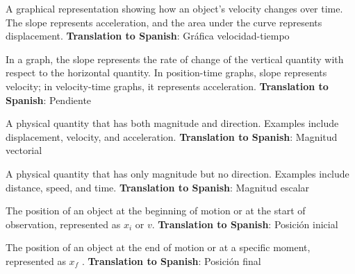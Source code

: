 \begin{vocabulary}
A graphical representation showing how an object's velocity changes over time. The slope represents acceleration, and the area under the curve represents displacement. \newline
\textbf{Translation to Spanish}: Gráfica velocidad-tiempo \newline
\end{vocabulary}

\begin{vocabulary}[Slope]
In a graph, the slope represents the rate of change of the vertical quantity with respect to the horizontal quantity. In position-time graphs, slope represents velocity; in velocity-time graphs, it represents acceleration. \newline
\textbf{Translation to Spanish}: Pendiente \newline
\end{vocabulary}

\begin{vocabulary}
A physical quantity that has both magnitude and direction. Examples include displacement, velocity, and acceleration. \newline
\textbf{Translation to Spanish}: Magnitud vectorial \newline
\end{vocabulary}

\begin{vocabulary}
A physical quantity that has only magnitude but no direction. Examples include distance, speed, and time. \newline
\textbf{Translation to Spanish}: Magnitud escalar \newline
\end{vocabulary}

\begin{vocabulary}
The position of an object at the beginning of motion or at the start of observation, represented as \( x_i \) or \(v  \). \newline
\textbf{Translation to Spanish}: Posición inicial \newline
\end{vocabulary}

\begin{vocabulary}
The position of an object at the end of motion or at a specific moment, represented as \( x_f \) . \newline
\textbf{Translation to Spanish}: Posición final \newline
\end{vocabulary}

